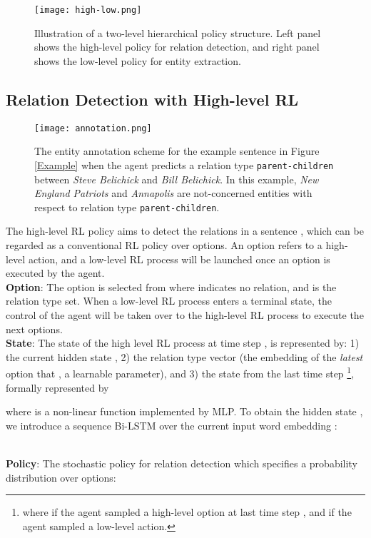 \documentclass[letterpaper]{article} \usepackage{aaai19}  \usepackage{times}  \usepackage{helvet}  \usepackage{courier}  \usepackage{url}  \usepackage{graphicx}  \frenchspacing  \setlength{\pdfpagewidth}{8.5in}  \setlength{\pdfpageheight}{11in}  \usepackage{amsfonts}
\theoremstyle{definition}
\begin{document}
\begin{figure}[!hptb]
    \centering
    \texttt{[image: high-low.png]}
    \caption{Illustration of a two-level hierarchical policy structure. Left panel shows the high-level policy for relation detection, and right panel shows the low-level policy for entity extraction.}
    \label{policy}
\end{figure}

\subsection{Relation Detection with High-level RL}

\begin{figure*}[!tpb]
    \centering
    \texttt{[image: annotation.png]}
    \caption{The entity annotation scheme for the example sentence in Figure \ref{Example} when the agent predicts a relation type \texttt{parent-children} between \textit{Steve Belichick} and \textit{Bill Belichick}. In this example, \textit{New England Patriots} and \textit{Annapolis} are not-concerned entities with respect to relation type \texttt{parent-children}.
    }
    \label{tag}
\end{figure*}

The high-level RL policy  aims to detect the relations in a sentence , which can be regarded as a conventional RL policy over options. An option refers to a high-level action, and a low-level RL process will be launched once an option is executed by the agent. 
\\
\textbf{Option}: The option  is selected from  where  indicates no relation, and  is the relation type set. When a low-level RL process enters a terminal state, the control of the agent will be taken over to the high-level RL process to execute the next options. 
\\
\textbf{State}: The state   of the high level RL process at time step , is represented by: 1) the current hidden state , 2) the relation type vector  (the embedding of the \textit{latest} option  that , a learnable parameter), and 3) the state from the last time step \footnote{where  if the agent sampled a high-level option at last time step , and  if the agent sampled a low-level action.}, formally represented by 

where  is a non-linear function implemented by MLP. To obtain the hidden state , we introduce a sequence Bi-LSTM over the current input word embedding :

\\
\textbf{Policy}: The stochastic policy for relation detection  which specifies a probability distribution over options:
\end{document}

